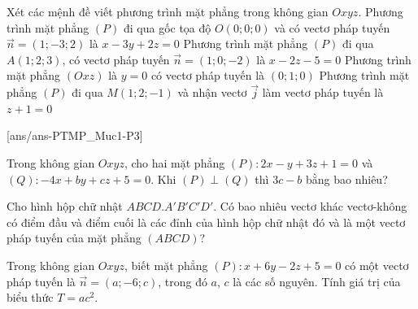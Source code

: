 \begin{ex}%
Xét các mệnh đề viết phương trình mặt phẳng trong không gian $Oxyz$.
\choiceTF
{\True Phương trình mặt phẳng $(P)$ đi qua gốc tọa độ $O(0; 0; 0)$ và có vectơ pháp tuyến $\overrightarrow{n} = (1; -3; 2)$ là $x - 3y + 2z = 0$}
{Phương trình mặt phẳng $(P)$ đi qua $A(1; 2; 3)$, có vectơ pháp tuyến $\overrightarrow{n} = (1; 0; -2)$ là $x - 2z - 5 = 0$}
{\True Phương trình mặt phẳng $(Oxz)$ là $y = 0$ có vectơ pháp tuyến là $(0; 1; 0)$}
{Phương trình mặt phẳng $(P)$ đi qua $M(1; 2; -1)$ và nhận vectơ $\overrightarrow{j}$ làm vectơ pháp tuyến là $z + 1 = 0$}
\end{ex}


\caukq
{}[ans/ans-PTMP_Muc1-P3]

\begin{ex}%
Trong không gian $Oxyz$, cho hai mặt phẳng $(P)\colon 2x - y + 3z + 1 = 0$ và $(Q)\colon -4x + by + cz + 5 = 0$. Khi $(P) \perp (Q)$ thì $3c - b$ bằng bao nhiêu?
\end{ex}

\begin{ex}%
Cho hình hộp chữ nhật $ABCD.A'B'C'D'$. Có bao nhiêu vectơ khác vectơ-không có điểm đầu và điểm cuối là các đỉnh của hình hộp chữ nhật đó và là một vectơ pháp tuyến của mặt phẳng $(ABCD)$?
\end{ex}

\begin{ex}%
Trong không gian $Oxyz$, biết mặt phẳng $(P)\colon x + 6y - 2z + 5 = 0$ có một vectơ pháp tuyến là $\overrightarrow{n} = (a; -6; c)$, trong đó $a$, $c$ là các số nguyên. Tính giá trị của biểu thức $T = ac^2$.
\end{ex}

